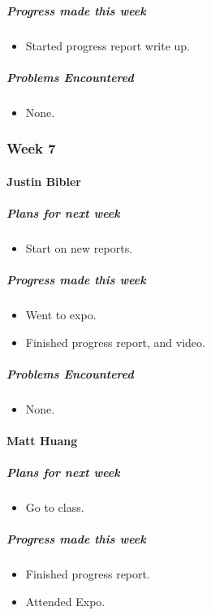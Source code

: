 {\subparagraph{Progress made this week}
\begin{itemize}
  \item Started progress report write up.
\end{itemize}

\subparagraph{Problems Encountered}
\begin{itemize}
  \item None.
\end{itemize}

}

\newpage

{
\subsubsection{Week 7}
\paragraph{Justin Bibler}
\subparagraph{Plans for next week}
\begin{itemize}
  \item Start on new reports.
\end{itemize}

\subparagraph{Progress made this week}
\begin{itemize}
  \item Went to expo.
  \item Finished progress report, and video.
\end{itemize}

\subparagraph{Problems Encountered}
\begin{itemize}
  \item None.
\end{itemize}
\vspace{3mm}

\paragraph{Matt Huang}
\subparagraph{Plans for next week}
\begin{itemize}
  \item Go to class.
\end{itemize}

\subparagraph{Progress made this week}
\begin{itemize}
  \item Finished progress report.
  \item Attended Expo.
\end{itemize}

}
